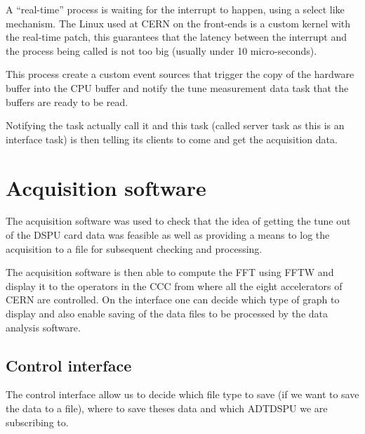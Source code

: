 A ``real-time'' process is waiting for the interrupt to happen, using a select like mechanism. The Linux used at \gls{CERN} on the front-ends is a custom kernel with the real-time patch, this guarantees that the latency between the interrupt and the process being called is not too big (usually under 10 micro-seconds).

This process create a custom event sources that trigger the copy of the hardware buffer into the \gls{CPU} buffer and notify the tune measurement data task that the buffers are ready to be read.

Notifying the task actually call it and this task (called server task as this is an interface task) is then telling its clients to come and get the acquisition data. 

\section{Acquisition software}

The acquisition software was used to check that the idea of getting the tune out of the DSPU card data was feasible as well as providing a means to log the acquisition to a file for subsequent checking and processing.

The acquisition software is then able to compute the \gls{FFT} using
\gls{FFTW} and display it to the operators in the \gls{CCC} from where
all the eight accelerators of \gls{CERN} are controlled. On the
interface one can decide which type of graph to display and also
enable saving of the data files to be processed by the data analysis
software.

\subsection{Control interface}

The control interface allow us to decide which file type to save (if we want to save the data to a file), where to save theses data and which ADTDSPU we are subscribing to.

